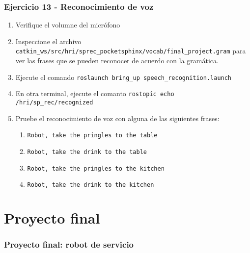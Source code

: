 \begin{frame}\frametitle{Ejercicio 13 - Reconocimiento de voz}
  \begin{enumerate}
  \item Verifique el volumne del micrófono
  \item Inspeccione el archivo \texttt{catkin\_ws/src/hri/sprec\_pocketsphinx/vocab/final\_project.gram} para ver las frases que se pueden reconocer de acuerdo con la gramática.
  \item Ejecute el comando \texttt{roslaunch bring\_up speech\_recognition.launch}
  \item En otra terminal, ejecute el comanto \texttt{rostopic echo /hri/sp\_rec/recognized}
  \item Pruebe el reconocimiento de voz con alguna de las siguientes frases:
    \begin{enumerate}
    \item \texttt{Robot, take the pringles to the table}
    \item \texttt{Robot, take the drink to the table}
    \item \texttt{Robot, take the pringles to the kitchen}
    \item \texttt{Robot, take the drink to the kitchen}
    \end{enumerate}
  \end{enumerate}
\end{frame}


\section{Proyecto final}

\begin{frame}\frametitle{Proyecto final: robot de servicio}
\end{frame}
